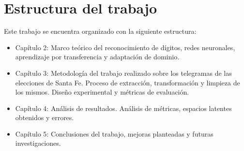 \section{Estructura del trabajo}
Este trabajo se encuentra organizado con la siguiente estructura:

\begin{itemize}
    \item Capítulo 2: Marco teórico del reconocimiento de dígitos, redes neuronales, aprendizaje por transferencia y adaptación
          de dominio.
    \item Capítulo 3: Metodología del trabajo realizado sobre los telegramas de las elecciones de Santa Fe. Proceso de
          extracción, transformación y limpieza de los mismos. Diseño experimental y métricas de evaluación.
    \item Capítulo 4: Análisis de resultados. Análisis de métricas, espacios latentes obtenidos y errores.
    \item Capítulo 5: Conclusiones del trabajo, mejoras planteadas y futuras investigaciones.
\end{itemize}